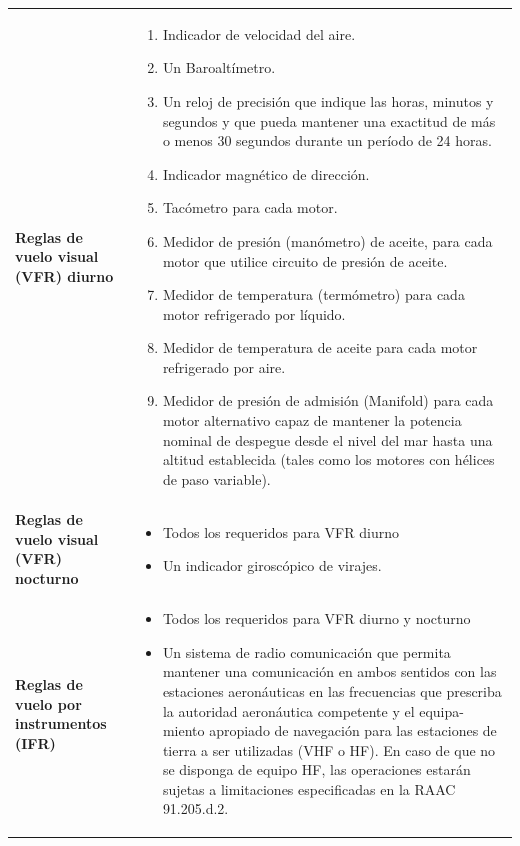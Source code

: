 \begin{longtable}{m{0.25\textwidth}m{0.75\textwidth}}
      {\bf Reglas de vuelo visual (VFR) diurno}
      &
      {\scriptsize
        \begin{enumerate}
        \item Indicador de velocidad del aire.
        \item Un Baroaltímetro.
        \item Un reloj de precisión que indique las horas, minutos y
          segundos y que pueda mantener una exactitud de más o menos
          30 segundos durante un período de 24 horas.
        \item Indicador magnético de dirección.
        \item Tacómetro para cada motor.
        \item Medidor de presión (manómetro) de aceite, para cada
          motor que utilice circuito de presión de aceite.
        \item Medidor de temperatura (termómetro) para cada motor
          refrigerado por líquido.
        \item Medidor de temperatura de aceite para cada motor
          refrigerado por aire.
        \item Medidor de presión de admisión (Manifold) para cada
          motor alternativo capaz de mantener la potencia nominal de
          despegue desde el nivel del mar hasta una altitud
          establecida (tales como los motores con hélices de paso
          variable).
        \end{enumerate}
      } \\ 
\textbf{Reglas  de  vuelo  visual  (VFR)  nocturno}
& {\scriptsize
\begin{itemize}
	\item Todos los requeridos para VFR diurno
        \item Un indicador giroscópico de virajes.
\end{itemize}
}
\\ %
\parbox{\linewidth}{\bf Reglas de vuelo por \\ instrumentos (IFR)}
& {\scriptsize
  \begin{itemize}
  \item Todos los requeridos para VFR diurno y nocturno
  \item Un sistema de radio comunicación que permita mantener una comunicación en ambos sentidos con las estaciones aeronáuticas en las frecuencias que prescriba la autoridad aeronáutica competente y el equipa-miento apropiado de navegación para las estaciones de tierra a ser utilizadas (VHF o HF). En caso de que no se disponga de equipo HF, las operaciones estarán sujetas a limitaciones especificadas en la RAAC 91.205.d.2.

\end{itemize}}
\end{longtable}
